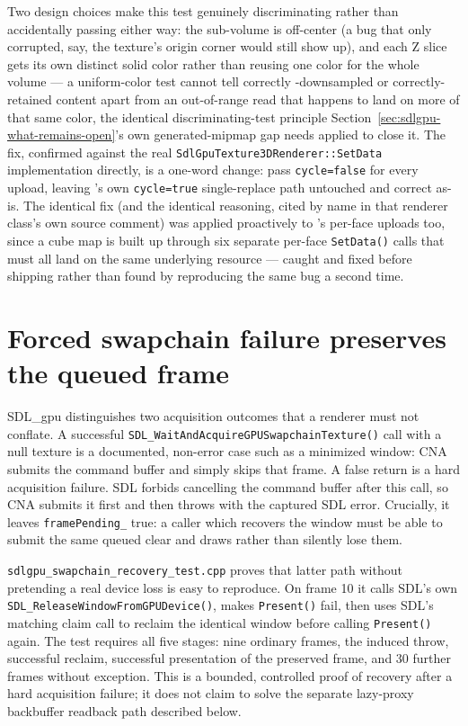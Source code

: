 Two design choices make this test genuinely discriminating rather than accidentally passing
either way: the sub-volume is off-center (a bug that only corrupted, say, the texture's
origin corner would still show up), and each Z slice gets its own distinct solid color rather
than reusing one color for the whole volume --- a uniform-color test cannot tell correctly
-downsampled or correctly-retained content apart from an out-of-range read that happens to
land on more of that same color, the identical discriminating-test principle
Section~\ref{sec:sdlgpu-what-remains-open}'s own generated-mipmap gap needs applied to close it.
The fix, confirmed against the real
\texttt{SdlGpuTexture3DRenderer::\allowbreak{}SetData} implementation
directly, is a one-word change: pass \texttt{cycle=false} for every 
upload, leaving 's own \texttt{cycle=true} single-replace path untouched
and correct as-is. The identical fix (and the identical reasoning, cited by name in that
renderer class's own source comment) was applied proactively to
's per-face uploads too, since a cube map is built up through six
separate per-face \texttt{SetData()} calls that must all land on the same underlying resource --- caught
and fixed before shipping rather than found by reproducing the same bug a second time.

\section{Forced swapchain failure preserves the queued frame}

SDL\_gpu distinguishes two acquisition outcomes that a renderer must not conflate. A successful
\texttt{SDL\_WaitAndAcquireGPUSwapchainTexture()} call with a null texture is a documented,
non-error case such as a minimized window: CNA submits the command buffer and simply skips that
frame. A false return is a hard acquisition failure. SDL forbids cancelling the command buffer
after this call, so CNA submits it first and then throws with the captured SDL error. Crucially,
it leaves \texttt{framePending\_} true: a caller which recovers the window must be able to submit
the same queued clear and draws rather than silently lose them.

\texttt{sdlgpu\_\allowbreak swapchain\_\allowbreak recovery\_\allowbreak test.cpp} proves that latter path without pretending a real
device loss is easy to reproduce. On frame 10 it calls SDL's own
\texttt{SDL\_\allowbreak ReleaseWindow\allowbreak FromGPU\allowbreak Device()}, makes \texttt{Present()} fail, then
uses SDL's matching claim call to reclaim the identical window before calling \texttt{Present()}
again. The test
requires all five stages: nine ordinary frames, the induced throw, successful reclaim, successful
presentation of the preserved frame, and 30 further frames without exception. This is a bounded,
controlled proof of recovery after a hard acquisition failure; it does not claim to solve the
separate lazy-proxy backbuffer readback path described below.

